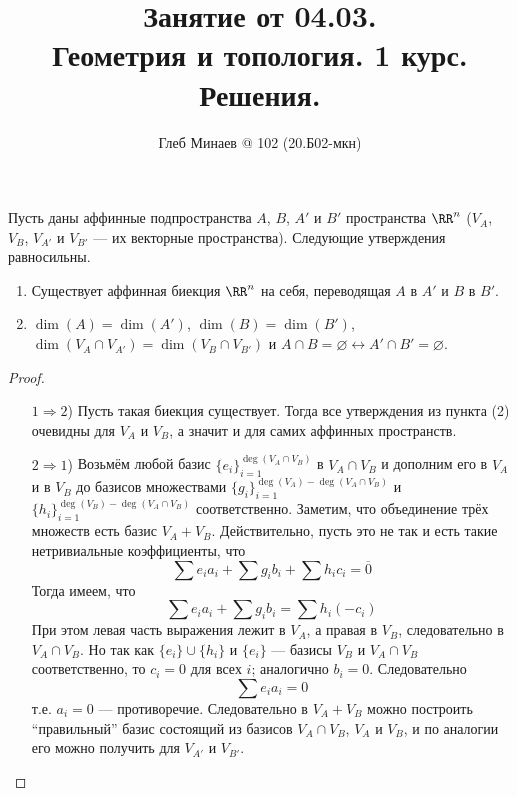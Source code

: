 \documentclass[12pt,a4paper]{article}
\title{Занятие от 04.03.\\Геометрия и топология. 1 курс.\\Решения.}
\author{Глеб Минаев @ 102 (20.Б02-мкн)}
\begin{document}
    \maketitle

    \begin{problem}{97}
        \begin{lemma}
            Пусть даны аффинные подпространства $A$, $B$, $A'$ и $B'$ пространства $\RR^n$ ($V_A$, $V_B$, $V_{A'}$ и $V_{B'}$ --- их векторные пространства). Следующие утверждения равносильны.
            \begin{enumerate}
                \item Существует аффинная биекция $\RR^n$ на себя, переводящая $A$ в $A'$ и $B$ в $B'$.
                \item $\dim(A) = \dim(A')$, $\dim(B) = \dim(B')$, $\dim(V_A \cap V_{A'}) = \dim(V_B \cap V_{B'})$ и $A \cap B = \varnothing \leftrightarrow A' \cap B' = \varnothing$.
            \end{enumerate}
        \end{lemma}

        \begin{proof}
            \begin{itemize}
                \item[$1 \Rightarrow 2$)] Пусть такая биекция существует. Тогда все утверждения из пункта (2) очевидны для $V_A$ и $V_B$, а значит и для самих аффинных пространств.
                \item[$2 \Rightarrow 1$)] Возьмём любой базис $\{e_i\}_{i=1}^{\deg(V_A \cap V_B)}$ в $V_A \cap V_B$ и дополним его в $V_A$ и в $V_B$ до базисов множествами $\{g_i\}_{i=1}^{\deg(V_A) - \deg(V_A \cap V_B)}$ и $\{h_i\}_{i=1}^{\deg(V_B) - \deg(V_A \cap V_B)}$ соответственно. Заметим, что объединение трёх множеств есть базис $V_A + V_B$. Действительно, пусть это не так и есть такие нетривиальные коэффициенты, что
                \[\sum e_i a_i + \sum g_i b_i + \sum h_i c_i = \overline{0}\]
                Тогда имеем, что
                \[\sum e_i a_i + \sum g_i b_i = \sum h_i (-c_i)\]
                При этом левая часть выражения лежит в $V_A$, а правая в $V_B$, следовательно в $V_A \cap V_B$. Но так как $\{e_i\} \cup \{h_i\}$ и $\{e_i\}$ --- базисы $V_B$ и $V_A \cap V_B$ соответственно, то $c_i = 0$ для всех $i$; аналогично $b_i = 0$. Следовательно
                \[\sum e_i a_i = 0\]
                т.е. $a_i = 0$ --- противоречие.
                Следовательно в $V_A + V_B$ можно построить ``правильный'' базис состоящий из базисов $V_A \cap V_B$, $V_A$ и $V_B$, и по аналогии его можно получить для $V_{A'}$ и $V_{B'}$.
                

\end{itemize}
\end{proof}
\end{problem}
\end{document}
